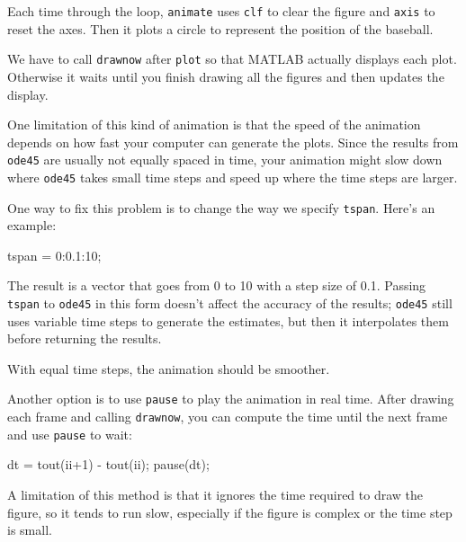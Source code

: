 
Each time through the loop, \lstinline{animate} uses \lstinline{clf}
to clear the figure and \lstinline{axis} to reset the axes.  Then it plots a circle to represent the position of the \mbox{baseball}.


We have to call \lstinline{drawnow} after \lstinline{plot} so
that MATLAB actually displays each plot.  Otherwise it waits
until you finish drawing all the figures and then updates
the display.

One limitation of this kind of animation is that the speed
of the animation depends on how fast your computer can generate
the plots.  Since the results from \lstinline{ode45} are usually not
equally spaced in time, your animation might slow down where
\lstinline{ode45} takes small time steps and speed up where the time
steps are larger.


One way to fix this problem is to change the way we specify \lstinline{tspan}.
Here's an example:

\begin{code}
    tspan = 0:0.1:10;
\end{code}

The result is a vector that goes from 0 to 10 with a step size of 0.1.
Passing \lstinline{tspan} to \lstinline{ode45} in this form doesn't affect the accuracy of the results;
\lstinline{ode45} still uses variable time steps to generate the estimates, but then it interpolates them before returning the results.


With equal time steps, the animation should be smoother.

Another option is to use \lstinline{pause} to play the animation in
real time.  After drawing each frame and calling
\lstinline{drawnow}, you can compute the time
until the next frame and use \lstinline{pause} to wait:

\begin{code}
    dt = tout(ii+1) - tout(ii);
    pause(dt);
\end{code}

A limitation of this method is that it ignores the time required to
draw the figure, so it tends to run slow, especially if the figure is
complex or the time step is small.

